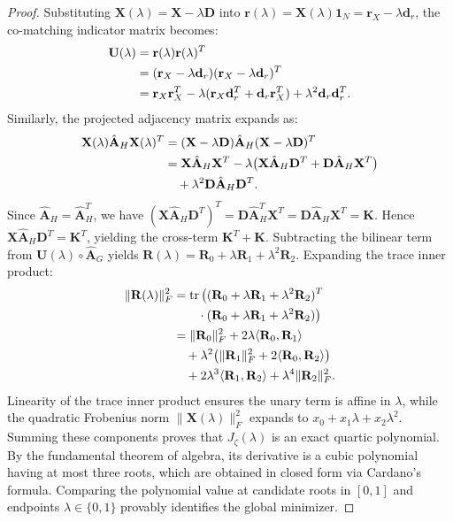 \documentclass[conference]{IEEEtran}
\begin{document}
\begin{proof}
Substituting $\mathbf{X}(\lambda) = \mathbf{X} - \lambda \mathbf{D}$ into $\mathbf{r}(\lambda) = \mathbf{X}(\lambda)\mathbf{1}_N = \mathbf{r}_X - \lambda \mathbf{d}_r$, the co-matching indicator matrix becomes:
\begin{align}
\mathbf{U}(\lambda) &= \mathbf{r}(\lambda)\mathbf{r}(\lambda)^T \notag\\
&= (\mathbf{r}_X - \lambda \mathbf{d}_r)(\mathbf{r}_X - \lambda \mathbf{d}_r)^T \notag\\
&= \mathbf{r}_X \mathbf{r}_X^T - \lambda(\mathbf{r}_X \mathbf{d}_r^T + \mathbf{d}_r \mathbf{r}_X^T) + \lambda^2 \mathbf{d}_r \mathbf{d}_r^T.
\end{align}
Similarly, the projected adjacency matrix expands as:
\begin{align}
\mathbf{X}(\lambda)\hat{\mathbf{A}}_H\mathbf{X}(\lambda)^T &= (\mathbf{X} - \lambda \mathbf{D})\hat{\mathbf{A}}_H(\mathbf{X} - \lambda \mathbf{D})^T \notag\\
&= \mathbf{X}\hat{\mathbf{A}}_H\mathbf{X}^T - \lambda\big(\mathbf{X}\hat{\mathbf{A}}_H\mathbf{D}^T + \mathbf{D}\hat{\mathbf{A}}_H\mathbf{X}^T\big) \notag\\
&\quad + \lambda^2 \mathbf{D}\hat{\mathbf{A}}_H\mathbf{D}^T.
\end{align}
Since $\hat{\mathbf{A}}_H = \hat{\mathbf{A}}_H^T$, we have $(\mathbf{X}\hat{\mathbf{A}}_H\mathbf{D}^T)^T = \mathbf{D}\hat{\mathbf{A}}_H^T\mathbf{X}^T = \mathbf{D}\hat{\mathbf{A}}_H\mathbf{X}^T = \mathbf{K}$. Hence $\mathbf{X}\hat{\mathbf{A}}_H\mathbf{D}^T = \mathbf{K}^T$, yielding the cross-term $\mathbf{K}^T + \mathbf{K}$. Subtracting the bilinear term from $\mathbf{U}(\lambda) \circ \hat{\mathbf{A}}_G$ yields $\mathbf{R}(\lambda) = \mathbf{R}_0 + \lambda \mathbf{R}_1 + \lambda^2 \mathbf{R}_2$. Expanding the trace inner product:
\begin{align}
\|\mathbf{R}(\lambda)\|_F^2 &= \operatorname{tr}\big((\mathbf{R}_0 + \lambda \mathbf{R}_1 + \lambda^2 \mathbf{R}_2)^T \notag\\
&\qquad \cdot (\mathbf{R}_0 + \lambda \mathbf{R}_1 + \lambda^2 \mathbf{R}_2)\big) \notag\\
&= \|\mathbf{R}_0\|_F^2 + 2\lambda\langle\mathbf{R}_0, \mathbf{R}_1\rangle \notag\\
&\quad + \lambda^2\big(\|\mathbf{R}_1\|_F^2 + 2\langle\mathbf{R}_0, \mathbf{R}_2\rangle\big) \notag\\
&\quad + 2\lambda^3\langle\mathbf{R}_1, \mathbf{R}_2\rangle + \lambda^4\|\mathbf{R}_2\|_F^2.
\end{align}
Linearity of the trace inner product ensures the unary term is affine in $\lambda$, while the quadratic Frobenius norm $\|\mathbf{X}(\lambda)\|_F^2$ expands to $x_0 + x_1 \lambda + x_2 \lambda^2$. Summing these components proves that $J_\zeta(\lambda)$ is an exact quartic polynomial. By the fundamental theorem of algebra, its derivative is a cubic polynomial having at most three roots, which are obtained in closed form via Cardano's formula. Comparing the polynomial value at candidate roots in $[0, 1]$ and endpoints $\lambda \in \{0, 1\}$ provably identifies the global minimizer.
\end{proof}
\end{document}
